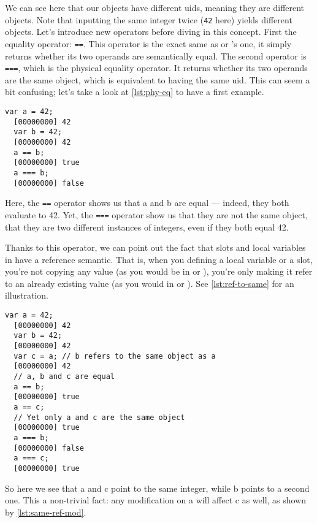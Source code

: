 \documentclass[openright,twoside,12pt]{report}
\begin{document}
We can see here that our objects have different uids, meaning they are
different objects. Note that inputting the same integer twice
(\texttt{42} here) yields different objects. Let's introduce new
operators before diving in this concept. First the equality operator:
\texttt{==}. This operator is the exact same as \C or \Cxx's one, it
simply returns whether its two operands are semantically equal. The
second operator is \texttt{===}, which is the physical equality
operator. It returns whether its two operands are the same object,
which is equivalent to having the same uid. This can seem a bit
confusing; let's take a look at \autoref{lst:phy-eq} to have a first example.

\begin{lstlisting}[caption=Physical equality operator,
  label=lst:phy-eq]
  var a = 42;
  [00000000] 42
  var b = 42;
  [00000000] 42
  a == b;
  [00000000] true
  a === b;
  [00000000] false
\end{lstlisting}

Here, the \texttt{==} operator shows us that a and b are equal ---
indeed, they both evaluate to 42. Yet, the \texttt{===} operator show
us that they are not the same object, that they are two different
instances of integers, even if they both equal 42.

Thanks to this operator, we can point out the fact that slots and
local variables in \urbi have a reference semantic. That is, when you
defining a local variable or a slot, you're not copying any value (as
you would be in \C or \Cxx), you're only making it refer to an already
existing value (as you would in \ruby or \java). See \autoref{lst:ref-to-same}
for an illustration.

\begin{lstlisting}[caption=Two references to the same object,
  label=lst:ref-to-same]
  var a = 42;
  [00000000] 42
  var b = 42;
  [00000000] 42
  var c = a; // b refers to the same object as a
  [00000000] 42
  // a, b and c are equal
  a == b;
  [00000000] true
  a == c;
  // Yet only a and c are the same object
  [00000000] true
  a === b;
  [00000000] false
  a === c;
  [00000000] true
\end{lstlisting}

So here we see that a and c point to the same integer, while b points
to a second one. This a non-trivial fact: any modification on a will
affect c as well, as shown by \autoref{lst:same-ref-mod}.
\end{document}
